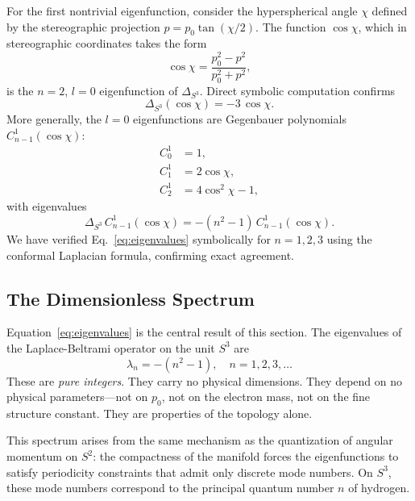 \documentclass[aps,pra,twocolumn,superscriptaddress,longbibliography]{revtex4-2}
\begin{document}
For the first nontrivial eigenfunction, consider the hyperspherical angle $\chi$ defined by the stereographic projection $p = p_0 \tan(\chi/2)$. The function $\cos\chi$, which in stereographic coordinates takes the form
\begin{equation}
\cos\chi = \frac{p_0^2 - p^2}{p_0^2 + p^2},
\label{eq:cos_chi}
\end{equation}
is the $n = 2$, $l = 0$ eigenfunction of $\Delta_{S^3}$. Direct symbolic computation confirms
\begin{equation}
\Delta_{S^3}(\cos\chi) = -3\,\cos\chi.
\label{eq:eigenvalue_n2}
\end{equation}
More generally, the $l = 0$ eigenfunctions are Gegenbauer polynomials $C^1_{n-1}(\cos\chi)$:
\begin{align}
C^1_0 &= 1, \\
C^1_1 &= 2\cos\chi, \\
C^1_2 &= 4\cos^2\chi - 1,
\end{align}
with eigenvalues
\begin{equation}
\Delta_{S^3}\, C^1_{n-1}(\cos\chi) = -(n^2 - 1)\, C^1_{n-1}(\cos\chi).
\label{eq:eigenvalues}
\end{equation}
We have verified Eq.~\eqref{eq:eigenvalues} symbolically for $n = 1, 2, 3$ using the conformal Laplacian formula, confirming exact agreement.

\subsection{The Dimensionless Spectrum}

Equation~\eqref{eq:eigenvalues} is the central result of this section. The eigenvalues of the Laplace-Beltrami operator on the unit $S^3$ are
\begin{equation}
\lambda_n = -(n^2 - 1), \quad n = 1, 2, 3, \ldots
\label{eq:s3_spectrum}
\end{equation}
These are \textit{pure integers}. They carry no physical dimensions. They depend on no physical parameters---not on $p_0$, not on the electron mass, not on the fine structure constant. They are properties of the topology alone.

This spectrum arises from the same mechanism as the quantization of angular momentum on $S^2$: the compactness of the manifold forces the eigenfunctions to satisfy periodicity constraints that admit only discrete mode numbers. On $S^3$, these mode numbers correspond to the principal quantum number $n$ of hydrogen.
\end{document}
